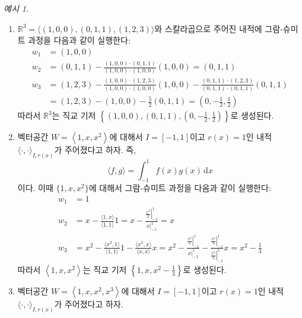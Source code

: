 \documentclass[unfonts,oneside,a4paper]{oblivoir}
\theoremstyle{definition}
\theoremstyle{theorem}
\theoremstyle{theorem}
\theoremstyle{remark}
\theoremstyle{remark}
\theoremstyle{remark}
\newtheorem*{example}{예시}
\theoremstyle{remark}
\renewcommand{\vec}[1]{\bm{\mathit{#1}}}
\newcommand{\dd}{\mathrm{d}}
\begin{document}
\begin{example}
    \leavevmode
    \begin{enumerate}
        \item $\mathbb R^3 = \langle (1, 0, 0), (0, 1, 1), (1, 2, 3) \rangle$와 스칼라곱으로 주어진 내적에 그람-슈미트 과정을 다음과 같이 실행한다:
            \begin{align*}
                \vec w_1 &= (1, 0, 0)\\
                \vec w_2 &= (0, 1, 1) - \frac{(1, 0, 0) \cdot (0, 1, 1)}{(1, 0, 0) \cdot (1, 0, 0)} (1, 0, 0) = (0, 1, 1)\\
                \vec w_3 &= (1, 2, 3) - \frac{(1, 0, 0) \cdot (1, 2, 3)}{(1, 0, 0) \cdot (1, 0, 0)}(1, 0, 0) - \frac{(0, 1, 1) \cdot (1, 2, 3)}{(0, 1, 1) \cdot (0, 1, 1)}(0, 1, 1)\\
                         &= (1, 2, 3) - (1, 0, 0) - \frac 52 (0, 1, 1) = \left(0, -\frac 12, \frac 12\right)
            \end{align*}
            따라서 $\mathbb R^3$는 직교 기저 $\left\{(1, 0, 0), (0, 1, 1), \left(0, -\frac12, \frac12\right)\right\}$로 생성된다.
        \item 벡터공간 $W = \left< 1, x, x^2 \right>$에 대해서 $I = [-1, 1]$이고 $r(x) = 1$인 내적 $\langle \cdot, \cdot \rangle_{I, r(x)}$가 주어졌다고 하자.
            즉,
            \begin{equation*}
                \langle f, g \rangle = \int_{-1}^1 f(x) g(x)\,\dd x
            \end{equation*}
            이다.
            이때 $\{1, x, x^2\}$에 대해서 그람-슈미트 과정을 다음과 같이 실행한다:
            \begin{align*}
                \vec w_1 &= 1\\
                \vec w_2 &= x - \frac{\langle 1, x \rangle}{\langle 1, 1\rangle} 1 = x - \frac{\left. \frac{x^2}{2}\right|_{-1}^1}{\left. x\right|_{-1}^1} = x\\
                \vec w_3 &= x^2 - \frac{\langle x^2, 1 \rangle}{\langle 1, 1\rangle} 1 - \frac{\langle x^2, x\rangle}{\langle x, x \rangle} x = x^2 - \frac{\left.\frac{x^3}{3}\right|_{-1}^1}{\left. x \right|_{-1}^1} - \frac{\left. \frac{x^4}{4} \right|_{-1}^1}{\left. \frac{x^3}{3} \right|_{-1}^1} x = x^2 - \frac13
            \end{align*}
            따라서 $\left< 1, x, x^2 \right>$는 직교 기저 $\left\{1, x, x^2 - \frac13\right\}$로 생성된다.
        \item 벡터공간 $W = \left< 1, x, x^2, x^3 \right>$에 대해서 $I = [-1, 1]$이고 $r(x) = 1$인 내적 $\langle \cdot, \cdot \rangle_{I, r(x)}$가 주어졌다고 하자.

\end{enumerate}
\end{example}
\end{document}
